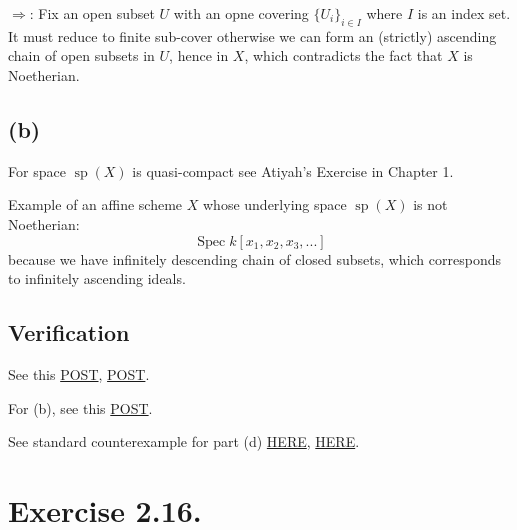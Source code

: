 $\Rightarrow$: Fix an open subset $U$ with an opne covering $\{U_i\}_{i\in I}$ where $I$ is an index set. It must reduce to finite sub-cover otherwise we can form an (strictly) ascending chain of open subsets in $U$, hence in $X$, which contradicts the fact that $X$ is Noetherian. 

\subsection{(b)}

For space $\operatorname{sp}(X)$ is quasi-compact see Atiyah's Exercise in Chapter 1. 

Example of an affine scheme $X$ whose underlying space $\operatorname{sp}(X)$ is not Noetherian: 
\[\operatorname{Spec}k[x_1,x_2,x_3,...]\] because we have infinitely descending chain of closed subsets, which corresponds to infinitely ascending ideals. 


\subsection{Verification}

See this \href{https://math.stackexchange.com/questions/1442665/a-noetherian-topological-space-is-compact}{POST}, \href{https://math.stackexchange.com/questions/2745543/v-is-noetherian-space-if-only-if-every-open-subset-of-v-is-compact}{POST}.

For (b), see this \href{https://math.stackexchange.com/questions/4690764/is-this-space-noetherian}{POST}.

See standard counterexample for part (d) \href{https://math.stackexchange.com/questions/1611732/example-of-non-noetherian-ring-whose-spectrum-is-noetherian/1611757#1611757}{HERE}, \href{https://math.stackexchange.com/questions/7392/a-non-noetherian-ring-with-noetherian-spectrum}{HERE}.


\section{Exercise 2.16.}

